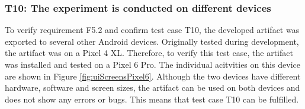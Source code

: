 \vspace{1cm}

\newpage\subsubsection*{T10: The experiment is conducted on different devices}

To verify requirement F5.2 and confirm test case T10, the developed artifact was exported to several other Android devices. Originally tested during development, the artifact was on a Pixel 4 XL. Therefore, to verify this test case, the artifact was installed and tested on a Pixel 6 Pro. The individual acitvities on this device are shown in Figure \ref{fig:uiScreensPixel6}. Although the two devices have different hardware, software and screen sizes, the artifact can be used on both devices and does not show any errors or bugs. This means that test case T10 can be fulfilled.

\vspace{1cm}

